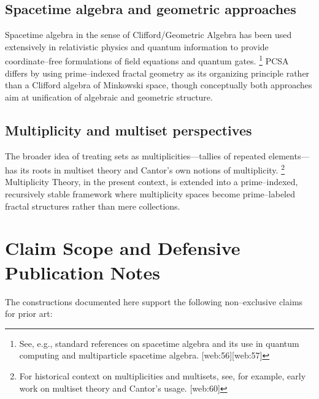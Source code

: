 \documentclass[11pt]{article}
\begin{document}
\subsection{Spacetime algebra and geometric approaches}

Spacetime algebra in the sense of Clifford/Geometric Algebra has been used extensively in relativistic physics and quantum information to provide coordinate--free formulations of field equations and quantum gates.%
\footnote{See, e.g., standard references on spacetime algebra and its use in quantum computing and multiparticle spacetime algebra. [web:56][web:57]} 
PCSA differs by using prime--indexed fractal geometry as its organizing principle rather than a Clifford algebra of Minkowski space, though conceptually both approaches aim at unification of algebraic and geometric structure.

\subsection{Multiplicity and multiset perspectives}

The broader idea of treating sets as multiplicities---tallies of repeated elements---has its roots in multiset theory and Cantor's own notions of multiplicity.%
\footnote{For historical context on multiplicities and multisets, see, for example, early work on multiset theory and Cantor's usage. [web:60]} 
Multiplicity Theory, in the present context, is extended into a prime--indexed, recursively stable framework where multiplicity spaces become prime--labeled fractal structures rather than mere collections.

\section{Claim Scope and Defensive Publication Notes}

The constructions documented here support the following non--exclusive claims for prior art:
\end{document}
